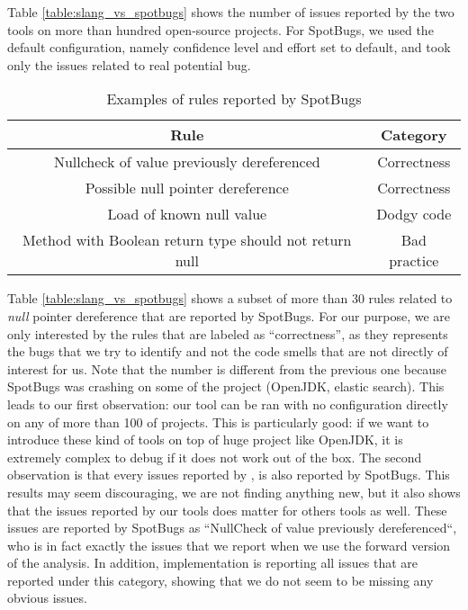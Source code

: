 Table \ref{table:slang_vs_spotbugs} shows the number of issues reported by the two tools on more than hundred open-source projects. 
For SpotBugs, we used the default configuration, namely confidence level and effort set to default, and took only the issues related to real potential bug.

\begin{table}[h]
	\centering
	\caption{Examples of rules reported by SpotBugs}
	\label{table:spotbugs-rules}
	\begin{tabular}{|c|c|}
		\hline
		\bf Rule & \bf Category\\ \hline
		Nullcheck of value previously dereferenced & Correctness  \\
		Possible null pointer dereference & Correctness  \\
		Load of known null value & Dodgy code \\
		Method with Boolean return type should not return null & Bad practice \\ \hline
	\end{tabular}
\end{table}

Table \ref{table:slang_vs_spotbugs} shows a subset of more than 30 rules related to \emph{null} pointer dereference that are reported by SpotBugs. 
For our purpose, we are only interested by the rules that are labeled as “correctness”, as they represents the bugs that we try to identify and not the code smells that are not directly of interest for us. \newline
Note that the number is different from the previous one because SpotBugs was crashing on some of the project (OpenJDK, elastic search). 
This leads to our first observation: our tool can be ran with no configuration directly on any of more than 100 of projects.
This is particularly good: if we want to introduce these kind of tools on top of huge project like OpenJDK, it is extremely complex to debug if it does not work out of the box. 
The second observation is that every issues reported by \slang{}, is also reported by SpotBugs. This results may seem discouraging, we are not finding anything new, but it also shows that the issues reported by our tools does matter for others tools as well. 
These issues are reported by SpotBugs as “NullCheck of value previously dereferenced“, who is in fact exactly the issues that we report when we use the forward version of the analysis. 
In addition, \slang{} implementation is reporting all issues that are reported under this category, showing that we do not seem to be missing any obvious issues. \newline

